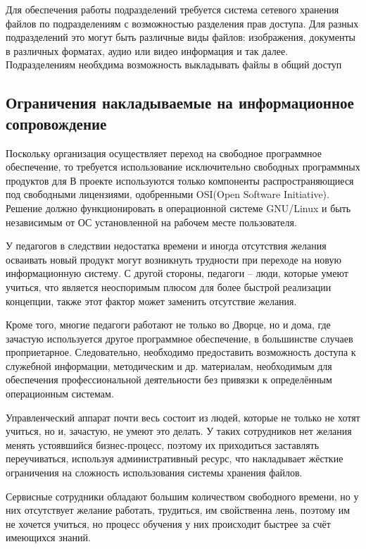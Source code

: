\documentclass[utf8,usehyperref,12pt]{G7-32}
\begin{document}
Для обеспечения работы подразделений требуется система сетевого хранения файлов по подразделениям с возможностью разделения прав доступа. Для разных подразделений это могут быть различные виды файлов: изображения, документы в различных форматах, аудио или видео информация и так далее. Подразделениям необхдима возможность выкладывать файлы в общий доступ

\subsection{Ограничения накладываемые на информационное сопровождение}
Поскольку организация осуществляет переход на свободное программное обеспечение, то требуется использование исключительно свободных программных продуктов для 
В проекте используются только компоненты распространяющиеся под свободными лицензиями, одобренными OSI(Open Software Initiative). Решение должно функционировать в операционной системе GNU/Linux и быть независимым от ОС установленной на рабочем месте пользователя.

У педагогов в следствии недостатка времени и иногда отсутствия желания осваивать новый продукт могут возникнуть трудности при переходе на новую информационную систему. С другой стороны, педагоги – люди, которые умеют учиться, что является неоспоримым плюсом для более быстрой реализации концепции, также этот фактор может заменить отсутствие желания.

Кроме того, многие педагоги работают не только во Дворце, но и дома, где зачастую используется другое программное обеспечение, в большинстве случаев проприетарное. Следовательно, необходимо предоставить возможность доступа к служебной информации, методическим и др. материалам, необходимым для обеспечения профессиональной деятельности без привязки к определённым операционным системам.

Управленческий аппарат почти весь состоит из людей, которые не только не хотят учиться, но и, зачастую, не умеют это делать. У таких сотрудников нет желания менять устоявшийся бизнес-процесс, поэтому их приходиться заставлять переучиваться, используя административный ресурс, что накладывает жёсткие ограничения на сложность использования системы хранения файлов.

Сервисные сотрудники обладают большим количеством свободного времени,
но у них отсутствует желание работать, трудиться, им свойственна лень, поэтому им не хочется учиться, но процесс обучения у них происходит быстрее за счёт имеющихся знаний.
\end{document}
